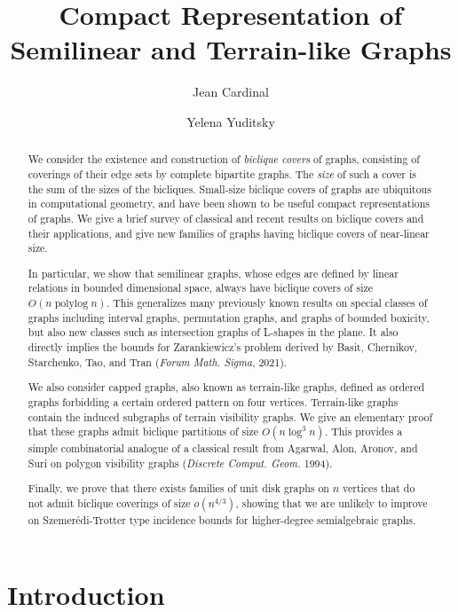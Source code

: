 \documentclass{amsart}
\title{Compact Representation of Semilinear and Terrain-like Graphs}
\author{Jean Cardinal}
\author{Yelena Yuditsky}
\DeclareMathOperator{\polylog}{\mathrm{polylog}}
\begin{document}
\maketitle

\begin{abstract}
We consider the existence and construction of \textit{biclique covers} of graphs, consisting of coverings of their edge sets by complete bipartite graphs. The \textit{size} of such a cover is the sum of the sizes of the bicliques.
Small-size biclique covers of graphs are ubiquitous in computational geometry, and have been shown to be useful compact representations of graphs.
We give a brief survey of classical and recent results on biclique covers and their applications, and give new families of graphs having biclique covers of near-linear size.

In particular, we show that semilinear graphs, whose edges are defined by linear relations in bounded dimensional space, always have biclique covers of size $O(n\polylog n)$. This generalizes many previously known results on special classes of graphs including interval graphs, permutation graphs, and graphs of bounded boxicity, but also new classes such as intersection graphs of L-shapes in the plane. 
It also directly implies the bounds for Zarankiewicz's problem derived by Basit, Chernikov, Starchenko, Tao, and Tran (\textit{Forum Math. Sigma}, 2021).

We also consider capped graphs, also known as terrain-like graphs, defined as ordered graphs forbidding a certain ordered pattern on four vertices. Terrain-like graphs contain the induced subgraphs of terrain visibility graphs. 
We give an elementary proof that these graphs admit biclique partitions of size $O(n\log^3 n)$.  
This provides a simple combinatorial analogue of a classical result from Agarwal, Alon, Aronov, and Suri on polygon visibility graphs (\textit{Discrete Comput. Geom.} 1994).

Finally, we prove that there exists families of unit disk graphs on $n$ vertices that do not admit biclique coverings of size $o(n^{4/3})$, showing that we are unlikely to improve on Szemer\'edi-Trotter type incidence bounds for higher-degree semialgebraic graphs.
\end{abstract}

\tableofcontents

\section{Introduction}
\end{document}

